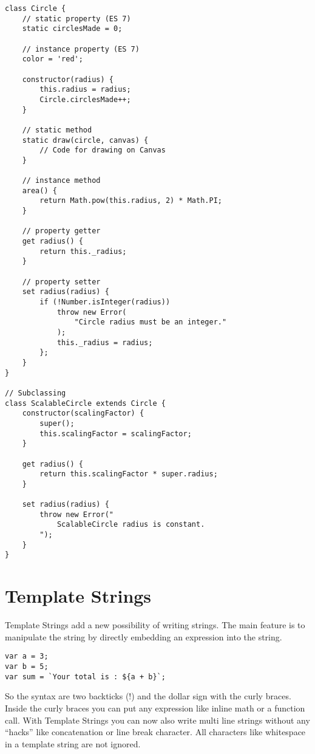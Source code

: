 \documentclass{bioinfo}
\begin{document}
\begin{lstlisting}
class Circle {
    // static property (ES 7)
    static circlesMade = 0;

    // instance property (ES 7)
    color = 'red';

    constructor(radius) {
        this.radius = radius;
        Circle.circlesMade++;
    }

    // static method
    static draw(circle, canvas) {
        // Code for drawing on Canvas
    }

    // instance method
    area() {
        return Math.pow(this.radius, 2) * Math.PI;
    }

    // property getter
    get radius() {
        return this._radius;
    }

    // property setter
    set radius(radius) {
        if (!Number.isInteger(radius))
            throw new Error(
                "Circle radius must be an integer."
            );
            this._radius = radius;
        };
    }
}

// Subclassing
class ScalableCircle extends Circle {
    constructor(scalingFactor) {
        super();
        this.scalingFactor = scalingFactor;
    }

    get radius() {
        return this.scalingFactor * super.radius;
    }

    set radius(radius) {
        throw new Error("
            ScalableCircle radius is constant.
        ");
    }
}
\end{lstlisting}

\section{Template Strings}
Template Strings add a new possibility of writing strings.
The main feature is to manipulate the string by
directly embedding an expression into the string.

\begin{lstlisting}
var a = 3;
var b = 5;
var sum = `Your total is : ${a + b}`;
\end{lstlisting}
So the syntax are two backticks (!) and the dollar sign with the curly braces.
Inside the curly braces you can put any expression like inline math or a function call.
With Template Strings you can now also write multi line strings without any ``hacks'' like
concatenation or line break character. All characters like whitespace in a template string
are not ignored.

%
%
%
%
%
%
%
%
%
\end{document}
